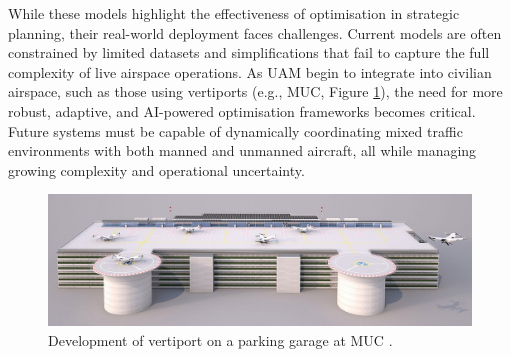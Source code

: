 While these models highlight the effectiveness of optimisation in strategic planning, their real-world deployment faces challenges.
Current models are often constrained by limited datasets and simplifications that fail to capture the full complexity of live airspace operations.
As \gls{UAM} begin to integrate into civilian airspace, such as those using vertiports (e.g., \gls{MUC}, Figure \ref{vertiport}), the need for more robust, adaptive, and \gls{AI}-powered optimisation frameworks becomes critical.
Future systems must be capable of dynamically coordinating mixed traffic environments with both manned and unmanned aircraft, all while managing growing complexity and operational uncertainty.

\begin{figure}[!ht]
    \centering
    \includegraphics[width=.6\textwidth]{img/vertiport.jpeg}
    \caption{Development of vertiport on a parking garage at \gls{MUC} \cite{amd_vertiport}.}
    \label{vertiport}
\end{figure}